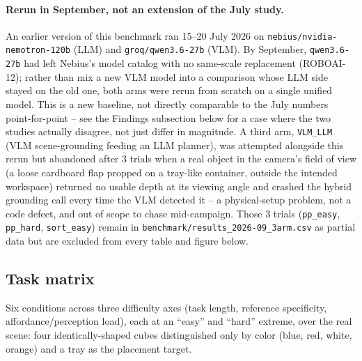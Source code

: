 \paragraph{Rerun in September, not an extension of the July study.} An
earlier version of this benchmark ran 15--20 July 2026 on
\texttt{nebius/nvidia-nemotron-120b} (LLM) and \texttt{groq/qwen3.6-27b}
(VLM). By September, \texttt{qwen3.6-27b} had left Nebius's model catalog
with no same-scale replacement (ROBOAI-12); rather than mix a new VLM model
into a comparison whose LLM side stayed on the old one, both arms were
rerun from scratch on a single unified model. This is a new baseline, not
directly comparable to the July numbers point-for-point -- see the
Findings subsection below for a case where the two studies actually
disagree, not just differ in magnitude. A
third arm, \texttt{VLM\_LLM} (VLM scene-grounding feeding an LLM planner),
was attempted alongside this rerun but abandoned after 3 trials when a
real object in the camera's field of view (a loose cardboard flap propped
on a tray-like container, outside the intended workspace) returned no
usable depth at its viewing angle and crashed the hybrid grounding call
every time the VLM detected it -- a physical-setup problem, not a code
defect, and out of scope to chase mid-campaign. Those 3 trials
(\texttt{pp\_easy}, \texttt{pp\_hard}, \texttt{sort\_easy}) remain in
\texttt{benchmark/results\_2026-09\_3arm.csv} as partial data but are
excluded from every table and figure below.

\subsection{Task matrix}

Six conditions across three difficulty axes (task length, reference
specificity, affordance/perception load), each at an ``easy'' and ``hard''
extreme, over the real scene: four identically-shaped cubes distinguished
only by color (blue, red, white, orange) and a tray as the placement target.

